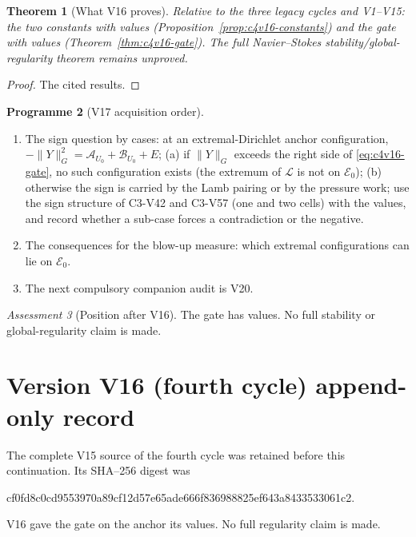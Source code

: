 \documentclass[11pt]{article}
\theoremstyle{plain}
\newtheorem{theorem}{Theorem}[section]
\theoremstyle{definition}
\newtheorem{programme}[theorem]{Programme}
\theoremstyle{remark}
\newtheorem{assessment}[theorem]{Assessment}
\begin{document}
\begin{theorem}[What V16 proves]
\label{thm:c4v16-conclusion}
Relative to the three legacy cycles and V1--V15: the two constants
with values (Proposition~\ref{prop:c4v16-constants}) and the gate with
values (Theorem~\ref{thm:c4v16-gate}).  The full Navier--Stokes
stability/global-regularity theorem remains unproved.
\end{theorem}

\begin{proof}
The cited results.
\end{proof}

\begin{programme}[V17 acquisition order]
\label{prog:c4v17}
\begin{enumerate}[label=\textup{(AC\arabic*)},leftmargin=4.8em]
\item The sign question by cases: at an extremal-Dirichlet anchor
      configuration, \(-\|Y\|_G^2=\mathcal A_{U_0}+\mathcal B_{U_0}+E\); (a) if \(\|Y\|_G\) exceeds the
      right side of \eqref{eq:c4v16-gate}, no such configuration exists
      (the extremum of \(\mathcal L\) is not on \(\mathcal E_0\)); (b) otherwise the sign is
      carried by the Lamb pairing or by the pressure work; use the
      sign structure of C3-V42 and C3-V57 (one and two cells) with the
      values, and record whether a sub-case forces a contradiction
      or the negative.
\item The consequences for the blow-up measure: which extremal
      configurations can lie on \(\mathcal E_0\).
\item The next compulsory companion audit is V20.
\end{enumerate}
\end{programme}

\begin{assessment}[Position after V16]
\label{ass:c4v16-position}
The gate has values.  No full stability or global-regularity claim
is made.
\end{assessment}

\section*{Version V16 (fourth cycle) append-only record}

The complete V15 source of the fourth cycle was retained before this
continuation.  Its SHA--256 digest was
\begin{center}\scriptsize\ttfamily
cf0fd8c0cd9553970a89cf12d57e65ade666f836988825ef643a8433533061c2.
\end{center}
V16 gave the gate on the anchor its values.  No full regularity
claim is made.
\end{document}
